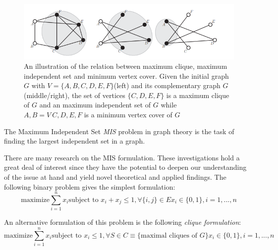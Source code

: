 \begin{figure}[h]
    \centering
    \includegraphics{figures/graph_clique_IS_dependencies.png}
    \caption{An illustration of the relation between maximum clique, maximum independent set and minimum vertex cover. Given the initial graph $G$ with $V = \{A, B, C,D, E, F\}$(left) and its complementary graph $G$ (middle/right), the set of vertices $\{C,D, E, F\}$ is a maximum clique of $G$ and an maximum independent set of $G$ while ${A, B} = V \ {C,D, E, F}$ is a minimum vertex cover of $G$}
    \label{fig:graph_clique_IS_dependencies}
\end{figure}

\begin{definition}
The Maximum Independent Set \textit{MIS} problem in graph theory is the task of finding
the largest independent set in a graph.
\end{definition}

There are many research on the MIS formulation. These investigations hold a great deal of interest since they have the potential to deepen our understanding of the issue at hand and yield novel theoretical and applied findings.
The following binary problem gives the simplest formulation:
\begin{subequations} \label{mis_binary_formulation_1}
\begin{equation} 
    \text{maximize} \sum_{i=1}^n x_i
\end{equation}
\begin{equation}
    \text{subject to } x_i+x_j \leq 1, \forall \{i,j\}\in E
\end{equation}
\begin{equation}
    x_i \in \{0,1\}, i = 1,...,n
\end{equation}
\end{subequations}

An alternative formulation of this problem is the following \textit{clique formulation}:
\begin{subequations}\label{clique_binary_formulation_1}
\begin{equation}
    \text{maximize} \sum_{i=1}^n x_i
\end{equation}
\begin{equation} \label{clique_binary_formulation_2}
    \text{subject to } x_i \leq 1, \forall S \in C \equiv \text{\{maximal cliques of $G$\}}
\end{equation}
\begin{equation}
    x_i \in \{0,1\}, i = 1,...,n
\end{equation}
\end{subequations}

